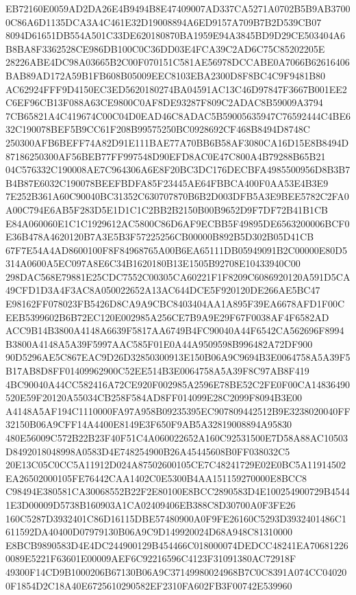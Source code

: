 \documentclass[UTF8,fontset=fandol,zihao=-4,a4paper]{ctexart}
\begin{document}
{{EB72160E0059AD2DA26E4B9494B8E47409007AD337CA5271A0702B5B9AB37000C86A6D1135DCA3A4C461E32D19008894A6ED9157A709B7B2D539CB07
8094D61651DB554A501C33DE620180870BA1959E94A3845BD9D29CE503404A6B8BA8F3362528CE986DB100C0C36DD03E4FCA39C2AD6C75C85202205E
28226ABE4DC98A03665B2C00F070151C581AE56978DCCABE0A7066B62616406BAB89AD172A59B1FB608B05009EEC8103EBA2300D8F8BC4C9F9481B80
AC62924FFF9D4150EC3ED5620180274BA04591AC13C46D97847F3667B001EE2C6EF96CB13F088A63CE9800C0AF8DE93287F809C2ADAC8B59009A3794
7CB65821A4C419674C00C04D0EAD46C8ADAC5B59005635947C76592444C4BE632C190078BEF5B9CC61F208B99575250BC0928692CF468B8494D8748C
250300AFB6BEFF74A82D91E111BAE77A70BB6B58AF3080CA16D15E8B8494D87186250300AF56BEB77FF997548D90EFD8AC0E47C800A4B79288B65B21
04C576332C190008AE7C964306A6E8F20BC3DC176DECBFA4985500956D8B3B7B4B87E6032C190078BEEFBDFA85F23445AE64FBBCA400F0AA53E4B3E9
7E252B361A60C90040BC31352C630707870B6B2D003DFB5A3E9BEE5782C2FA0A00C794E6AB5F283D5E1D1C1C2BB2B2150B00B9652D9F7DF72B41B1CB
E84A060060E1C1C1929612AC5800C86D6AF9ECBB5F49895DE6563200006BCF0E36B478A4620120B7A3E5B3F57225256CB00000B892B5D302B05D41CB
67F7E54A4AD8600100F8F84968765A00B6EA65111DB05949091B2C00000E80D5314A0600A5EC097A8E6C34B1620180B13E1505B92708E10433940C00
298DAC568E79881E25CDC7552C00305CA60221F1F8209C6086920120A591D5CA49CFD1D3A4F3AC8A050022652A13AC644DCE5F920120DE266AE5BC47
E98162FF078023FB5426D8CA9A9CBC8403404AA1A895F39EA6678AFD1F00CEEB5399602B6B72EC120E002985A256CE7B9A9E29F67F0038AF4F6582AD
ACC9B14B3800A4148A6639F5817AA6749B4FC90040A44F6542CA562696F8994B3800A4148A5A39F5997AAC585F01E0A44A9509598B996482A72DF900
90D5296AE5C867EAC9D26D32850300913E150B06A9C9694B3E0064758A5A39F5B17AB8D8FF01409962900C52EE514B3E0064758A5A39F8C97AB8F419
4BC90040A44CC582416A72CE920F002985A2596E78BE52C2FE0F00CA14836490520E59F20120A55034CB258F584AD8FF014099E28C2099F8094B3E00
A4148A5AF194C1110000FA97A958B09235395EC907809442512B9E3238020040FF32150B06A9CFF14A4400E8149E3F650F9AB5A32819008894A95830
480E56009C572B22B23F40F51C4A060022652A160C92531500E7D58A88AC10503D8492018048998A0583D4E748254900B26A45445608B0FF038032C5
20E13C05C0CC5A11912D024A87502600105CE7C48241729E02E0BC5A11914502EA26502000105FE76442CAA1402C0E5300B4AA151159270000E8BCC8
C98494E380581CA30068552B22F2E80100E8BCC2890583D4E100254900729B45441E3D00009D5738B160903A1CA02409406EB388C8D30700A0F3FE26
160C5287D3932401C86D16115DBE57480900A0F9FE26160C5293D3932401486C1611592DA40400D07979130B06A9C9D149920024D68A948C81310000
E8BCB9890583D4E4DC244900129B454466C018000074DEDCC48241EA706812260089E5221F63601E00009AEF6C92216596C4123F31091380AC72918F
49300F14CD9B1000206B67130B06A9C37149980024968B7C0C8391A074CC040200F1854D2C18A40E6725610290582EF2310FA602FB3F00742E539960
}}
\end{document}
